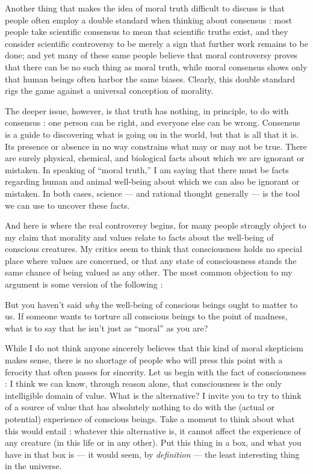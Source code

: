\documentclass[a4paper,14pt]{extarticle}
\begin{document}
Another thing that makes the idea of moral truth difficult to discuss is that people often employ a double standard when thinking about consensus :
most people take scientific consensus to mean that scientific truths exist, and they consider scientific controversy to be merely a sign that further work remains to be done;
and yet many of these same people believe that moral controversy proves that there can be no such thing as moral truth, while moral consensus shows only that human beings often harbor the same biases.
Clearly, this double standard rigs the game against a universal conception of morality.

The deeper issue, however, is that truth has nothing, in principle, to do with consensus :
one person can be right, and everyone else can be wrong.
Consensus is a guide to discovering what is going on in the world, but that is all that it is.
Its presence or absence in no way constrains what may or may not be true.
There are surely physical, chemical, and biological facts about which we are ignorant or mistaken.
In speaking of ``moral truth,'' I am saying that there must be facts regarding human and animal well-being about which we can also be ignorant or mistaken.
In both cases, science --- and rational thought generally --- is the tool we can use to uncover these facts.

And here is where the real controversy begins, for many people strongly object to my claim that morality and values relate to facts about the well-being of conscious creatures.
My critics seem to think that consciousness holds no special place where values are concerned, or that any state of consciousness stands the same chance of being valued as any other.
The most common objection to my argument is some version of the following :

But you haven't said \textit{why} the well-being of conscious beings ought to matter to us.
If someone wants to torture all conscious beings to the point of madness, what is to say that he isn't just as ``moral'' as you are?

While I do not think anyone sincerely believes that this kind of moral skepticism makes sense, there is no shortage of people who will press this point with a ferocity that often passes for sincerity.
Let us begin with the fact of consciousness :
I think we can know, through reason alone, that consciousness is the only intelligible domain of value.
What is the alternative?
I invite you to try to think of a source of value that has absolutely nothing to do with the (actual or potential) experience of conscious beings.
Take a moment to think about what this would entail :
whatever this alternative is, it cannot affect the experience of any creature (in this life or in any other).
Put this thing in a box, and what you have in that box is --- it would seem, by \textit{definition} --- the least interesting thing in the universe.
\end{document}

